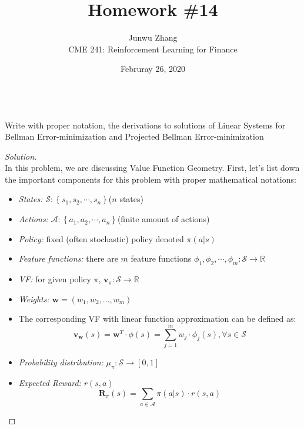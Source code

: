\documentclass[12pt]{article}
\date{Februray 26, 2020}
\newenvironment{problem}[2][Problem]{\begin{trivlist}
\item[\hskip \labelsep {\bfseries #1}\hskip \labelsep {\bfseries #2.}]}{\end{trivlist}}
\newenvironment{solution}
  {\renewcommand\qedsymbol{$\blacksquare$}\begin{proof}[Solution]}
  {\end{proof}}
\begin{document}
 
\title{Homework \#14}
\author{Junwu Zhang\\ 
CME 241: Reinforcement Learning for Finance \\}
\maketitle

\begin{problem}{1}
\text{ }\\
Write with proper notation, the derivations to solutions of Linear Systems for Bellman Error-minimization and Projected Bellman Error-minimization
\end{problem}
\begin{solution}
\text{ }\\
In this problem, we are discussing Value Function Geometry. First, let's list down the important components for this problem with proper mathematical notations:
\begin{itemize} [noitemsep]
	\item \textit{States:} $\mathcal{S}: \left\{s_1, s_2, \cdots, s_n\right\}$($n$ states) 
	\item \textit{Actions:} $\mathcal{A}: \left\{a_1, a_2, \cdots, a_n\right\}$(finite amount of actions)
	\item \textit{Policy:} fixed (often stochastic) policy denoted $\pi(a\vert s)$
	\item \textit{Feature functions:} there are $m$ feature functions $\phi_1, \phi_2, \cdots, \phi_m : \mathcal{S}\rightarrow\mathbb{R}$
	\item \textit{\gls{VF}:} for given policy $\pi$,  $\mathbf{v}_\pi : \mathcal{S} \rightarrow \mathbb{R}$
	\item \textit{Weights:} $\mathbf{w}=\left(w_{1}, w_{2}, \ldots, w_{m}\right)$
	\item The corresponding \gls{VF} with linear function approximation can be defined as:
	\begin{equation}
		\mathbf{v}_{\mathbf{w}}(s)=\mathbf{w}^{T} \cdot \phi(s)=\sum_{j=1}^{m} w_{j} \cdot \phi_{j}(s), \forall s \in \mathcal{S}
	\end{equation}
	\item \textit{Probability distribution:} $\mu_\pi : \mathcal{S}\rightarrow \left[0, 1\right]$
	\item \textit{Expected Reward:} $r(s, a)$
	\begin{equation}
		\mathbf{R}_{\pi}(s) =\sum_{a \in \mathcal{A}} \pi(a | s) \cdot r(s, a)
	\end{equation}

\end{itemize}
\end{solution}
\end{document}
